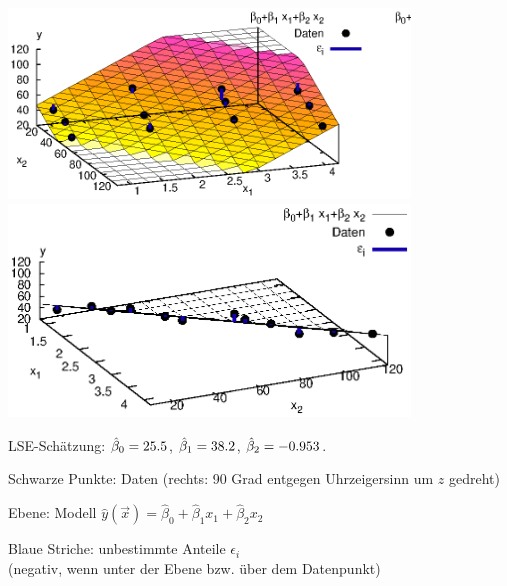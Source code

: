 \documentclass[a4paper]{foils}
\begin{document}
\begin{landscape}
\begin{center}
\newpage


\hspace{-0.1\textwidth}
\includegraphics[width=0.8\textwidth]{figsRegr/hotel_scatter3d_1.eps}
\hspace{-0.2\textwidth}
\includegraphics[width=0.8\textwidth]{figsRegr/hotel_scatter3d_2.eps}
\hspace{-0.1\textwidth}

{\small
LSE-Sch\"atzung:  $\hat{\beta}_0=25.5$, $\hat{\beta}_1=38.2$, $\hat{\beta}_2=-0.953$.

\vspace{2em}

\bi
\item Schwarze Punkte: Daten 
(rechts: 90 Grad entgegen Uhrzeigersinn um $z$ gedreht)\\[-1ex]

\item Ebene: Modell 
$\hat{y}(\vec{x})=\hat{\beta}_0+\hat{\beta}_1x_1+\hat{\beta}_2x_2$\\[-1ex]

\item Blaue Striche:  unbestimmte Anteile
$\epsilon_i$\\ (negativ, wenn unter der Ebene bzw. \"uber dem Datenpunkt)
\ei
}

\newpage
 \vspace{0em}


\end{center}
\end{landscape}
\end{document}
